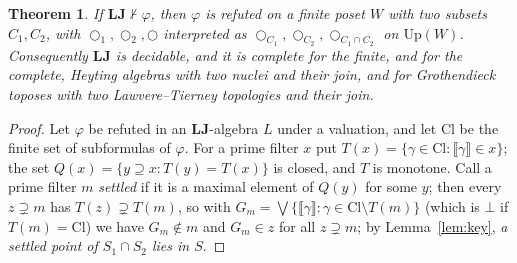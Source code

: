 \documentclass[11pt]{amsart}
\newtheorem{thm}{Theorem}[section]
\theoremstyle{definition}
\newcommand{\Up}{\mathrm{Up}}
\newcommand{\LLJ}{\mathbf{LJ}}
\newcommand{\lax}{\bigcirc}
\newcommand{\laxa}{\bigcirc_1}
\newcommand{\laxb}{\bigcirc_2}
\begin{document}
\begin{thm}\label{thm:fmp}
If $\LLJ\nvdash\varphi$, then $\varphi$ is refuted on a finite poset $W$ with
two subsets $C_1,C_2$, with $\laxa,\laxb,\lax$ interpreted as
$\lax_{C_1},\lax_{C_2},\lax_{C_1\cap C_2}$ on $\Up(W)$. Consequently $\LLJ$ is
decidable, and it is complete for the finite, and for the complete, Heyting
algebras with two nuclei and their join, and for Grothendieck toposes with two
Lawvere--Tierney topologies and their join.
\end{thm}
\begin{proof}
Let $\varphi$ be refuted in an $\LLJ$-algebra $L$ under a valuation, and let
$\mathrm{Cl}$ be the finite set of subformulas of $\varphi$. For a prime filter
$x$ put $T(x)=\{\gamma\in\mathrm{Cl}:\llbracket\gamma\rrbracket\in x\}$; the set
$Q(x)=\{y\supseteq x:T(y)=T(x)\}$ is closed, and $T$ is monotone. Call a
prime filter $m$ \emph{settled} if it is a maximal element of $Q(y)$ for some
$y$; then every $z\supsetneq m$ has $T(z)\supsetneq T(m)$, so with
$G_m=\bigvee\{\llbracket\gamma\rrbracket:\gamma\in\mathrm{Cl}\setminus T(m)\}$
(which is $\bot$ if $T(m)=\mathrm{Cl}$) we have $G_m\notin m$ and $G_m\in z$ for
all $z\supsetneq m$; by Lemma~\ref{lem:key}, \emph{a settled point of
$S_1\cap S_2$ lies in $S$}.


\end{proof}
\end{document}
